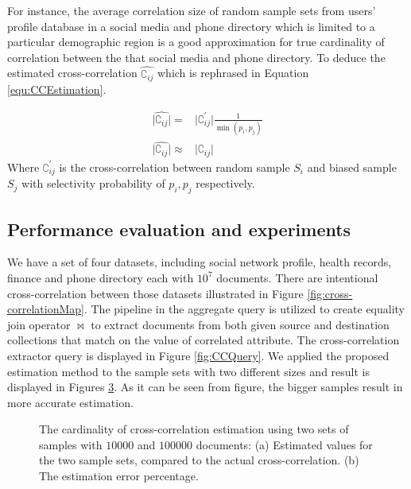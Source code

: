 For instance, the average correlation size of random sample sets from users' profile database in a social media and phone directory which is limited to a particular demographic region is a good approximation for true cardinality of correlation between the that social media and phone directory. To deduce the estimated cross-correlation $\hat{\complement_{ij}}$ which is rephrased in Equation \ref{equ:CCEstimation}.

\begin{equation} 
\label{equ:CCEstimation}
\begin{aligned}
\vert \hat{\complement_{ij}}\vert=& \vert \complement^{\prime}_{ij}\vert \frac{1}{\min(p_i,p_j)}\\
\vert \hat{\complement_{ij}}\vert \approx & \vert \complement_{ij}\vert
\end{aligned}
\end{equation}
Where $\complement^{\prime}_{ij}$ is the cross-correlation between random sample $S_i$ and biased sample $S_j$ with selectivity probability of $p_i, p_j$ respectively.

\subsection{Performance evaluation and experiments}
\label{PerformanceSubSection}
We have a set of four datasets, including social network profile, health records, finance and phone directory each with $10^7$ documents. There are intentional cross-correlation between those datasets illustrated in Figure \ref{fig:cross-correlationMap}. The pipeline in the aggregate query is utilized to create equality join operator $\bowtie$ to extract documents from both given source and destination collections that match on the value of correlated attribute. The cross-correlation extractor query is displayed in Figure \ref{fig:CCQuery}. We applied the proposed estimation method to the sample sets with two different sizes and result is displayed in Figures \ref{fig:CCAproximation}. As it can be seen from figure, the bigger samples result in more accurate estimation. 




\begin{figure}[H]
\begin{subfigure}{0.5\textwidth}
\centering
\resizebox{1.0\textwidth}{!}{}
\label{fig:CCEstimation}
\caption{}
\end{subfigure}
\qquad 
\begin{subfigure}{0.5\textwidth}
\resizebox{1.0\textwidth}{!}{}
\label{fig:speedup}
\caption{}
\end{subfigure}
\caption{The cardinality of cross-correlation estimation using two sets of samples with $10000$ and $100000$ documents: (a) Estimated values for the two sample sets, compared to the actual cross-correlation. (b) The estimation error percentage.}
\label{fig:CCAproximation}
\end{figure}